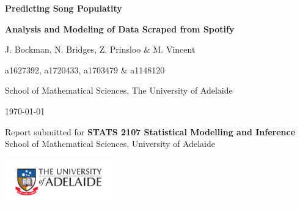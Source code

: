 \documentclass[12t]{article}
\begin{document}
 	\newcommand{\titlestr}{Predicting Song Populatity}
 	\newcommand{\shorttitlestr}{Analysis and Modeling of Data Scraped from Spotify}
 	\newcommand{\groupnames}{J. Bockman, N. Bridges, Z. Prinsloo \& M. Vincent} 
 	\newcommand{\studentids}{a1627392, a1720433, a1703479 \& a1148120}
 	\newcommand{\authorstr}{\groupnames}
 	
 	\begin{titlepage}
 		\centering
 		
 		{\LARGE \bf \titlestr \par}
 		\vspace{0.25cm}
 		{\large \bf \shorttitlestr \par}
 		
 		
 		\vspace{1cm}
 		{\large \authorstr \par}
 		\vspace{0.05cm}
 		{\large  \studentids \par}
 		\vspace{0.25cm}
 		
 		\large School of Mathematical Sciences, The University of Adelaide
 		
 		\vspace{1cm}
 		\today
 		
 		\vspace{3cm}
 		Report submitted for
 		{\bf STATS 2107 Statistical Modelling and Inference}
 		School of Mathematical Sciences,
 		University of Adelaide
 		
 		\includegraphics[width=0.35\textwidth]{./Figures/UoA_logo_cmyk.pdf}
 		
 		\vspace{5cm}
 		
 		\begin{abstract}
		\noindent This paper examines data taken from the online music streaming platform Spotify, and constructs a linear regression model for predicting song popularity. A description of the data used in the analysis is provided, along with the steps taken to clean it. Both univariate and bivariate analyses were undertaken prior to selecting the model. Model selection incorporated forward, backward and stepwise algorithms, and both the Akaike and Bayesian information criteria. The cross validated mean square error of each model in conjunction with complexity were used to select the final model. This resulted in a model that uses five of the eight available predictor variables; decade, danceability, loudness, energy and  duration, with two interaction terms between energy and duration, and decade and loudness. After the linear assumptions of the model were found to be valid, a prediction was made using new data. 
 		\end{abstract}
 	 	\vspace{1mm}
 		\noindent \hrulefill
 		
 		\vfill
 \end{titlepage}
\end{document}
